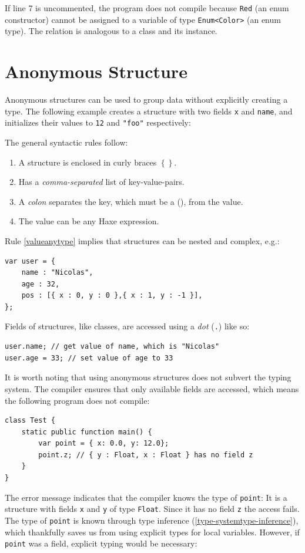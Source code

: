 \documentclass[a4paper,oneside]{book}
\newcommand{\type}[1]{\texttt{#1}}
\newcommand{\expr}[1]{\texttt{#1}}
\newcommand{\Fullref}[1]{\nameref{#1} (\Cref{#1})}
\newcommand{\tref}[2]{#1 (\ref{#2})}
\newcommand{\haxe}[2][]{%
}
\begin{document}
\haxe{assets/EnumUnification.hx}
If line 7 is uncommented, the program does not compile because \expr{Red} (an enum constructor) cannot be assigned to a variable of type \type{Enum<Color>} (an enum type). The relation is analogous to a class and its instance.



\section{Anonymous Structure}
\label{types-anonymous-structure}

Anonymous structures can be used to group data without explicitly creating a type. The following example creates a structure with two fields \expr{x} and \expr{name}, and initializes their values to \expr{12} and \expr{"foo"} respectively:

\haxe{assets/Structure.hx}
The general syntactic rules follow:

\begin{enumerate}
	\item A structure is enclosed in curly braces \expr{$\left\{\right\}$}. 
	\item Has a \emph{comma-separated} list of key-value-pairs.
	\item A \emph{colon} separates the key, which must be a \Fullref{def:Identifier}, from the value.
	\item\label{valueanytype} The value can be any Haxe expression.
\end{enumerate}
Rule \ref{valueanytype} implies that structures can be nested and complex, e.g.:

\begin{lstlisting}
var user = {
    name : "Nicolas",
    age : 32,
    pos : [{ x : 0, y : 0 },{ x : 1, y : -1 }],
};
\end{lstlisting}
Fields of structures, like classes, are accessed using a \emph{dot} (\expr{.}) like so:

\begin{lstlisting}
user.name; // get value of name, which is "Nicolas"
user.age = 33; // set value of age to 33
\end{lstlisting}
It is worth noting that using anonymous structures does not subvert the typing system. The compiler ensures that only available fields are accessed, which means the following program does not compile:

\begin{lstlisting}
class Test {
	static public function main() {
		var point = { x: 0.0, y: 12.0};
		point.z; // { y : Float, x : Float } has no field z
	}
}
\end{lstlisting}
The error message indicates that the compiler knows the type of \expr{point}: It is a structure with fields \expr{x} and \expr{y} of type \type{Float}. Since it has no field \expr{z} the access fails.
The type of \expr{point} is known through \tref{type inference}{type-systemtype-inference}, which thankfully saves us from using explicit types for local variables. However, if \expr{point} was a field, explicit typing would be necessary:
\end{document}
